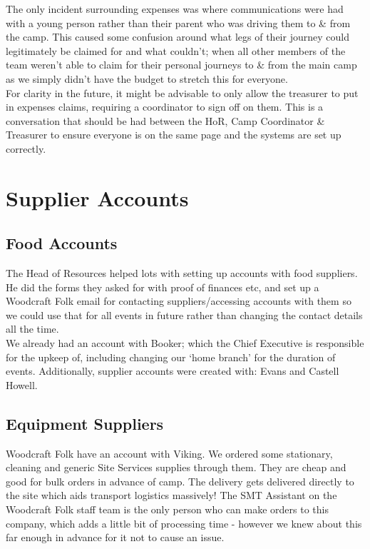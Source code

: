 The only incident surrounding expenses was where communications were had with a young person rather than their parent who was driving them to \& from the camp. This caused some confusion around what legs of their journey could legitimately be claimed for and what couldn't; when all other members of the team weren't able to claim for their personal journeys to \& from the main camp as we simply didn't have the budget to stretch this for everyone.\\

For clarity in the future, it might be advisable to only allow the treasurer to put in expenses claims, requiring a coordinator to sign off on them. This is a conversation that should be had between the HoR, Camp Coordinator \& Treasurer to ensure everyone is on the same page and the systems are set up correctly.

\section{Supplier Accounts}
\subsection{Food Accounts}
The Head of Resources helped lots with setting up accounts with food suppliers. He did the forms they asked for with proof of finances etc, and set up a Woodcraft Folk email for contacting suppliers/accessing accounts with them so we could use that for all events in future rather than changing the contact details all the time.\\

We already had an account with Booker; which the Chief Executive is responsible for the upkeep of, including changing our `home branch' for the duration of events. Additionally, supplier accounts were created with: Evans and Castell Howell.

\subsection{Equipment Suppliers}
Woodcraft Folk have an account with Viking. We ordered some stationary, cleaning and generic Site Services supplies through them. They are cheap and good for bulk orders in advance of camp. The delivery gets delivered directly to the site which aids transport logistics massively! The SMT Assistant on the Woodcraft Folk staff team is the only person who can make orders to this company, which adds a little bit of processing time - however we knew about this far enough in advance for it not to cause an issue.\\

